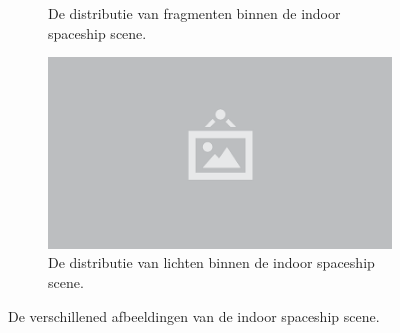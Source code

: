\begin{figure}[p]
\begin{subfigure}[b]{.49\linewidth}
    \caption{De distributie van fragmenten binnen de indoor spaceship scene.}\label{fig:test-suite-pipers-alley:fragments}
  \end{subfigure}%
  \begin{subfigure}[b]{.49\linewidth}
    \centering\includegraphics{./img/raw/placeholder.png}
    \caption{De distributie van lichten binnen de indoor spaceship scene.}\label{fig:test-suite-pipers-alley:lights}
  \end{subfigure}%
  \caption{De verschillened afbeeldingen van de indoor spaceship scene.}
  \label{fig:test-suite-pipers-alley-images}
\end{figure}
